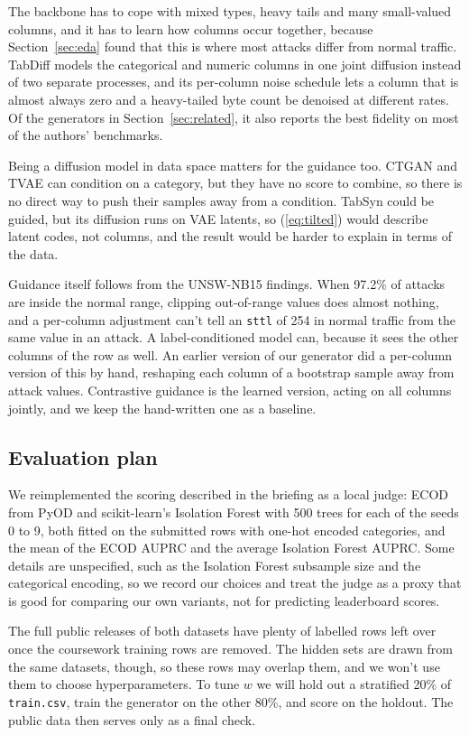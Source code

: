 \documentclass[11pt,a4paper]{article}
\newcommand{\col}[1]{\texttt{#1}}
\begin{document}
The backbone has to cope with mixed types, heavy tails and many small-valued columns, and it has to learn how columns occur together, because Section~\ref{sec:eda} found that this is where most attacks differ from normal traffic. TabDiff models the categorical and numeric columns in one joint diffusion instead of two separate processes, and its per-column noise schedule lets a column that is almost always zero and a heavy-tailed byte count be denoised at different rates. Of the generators in Section~\ref{sec:related}, it also reports the best fidelity on most of the authors' benchmarks.

Being a diffusion model in data space matters for the guidance too. CTGAN and TVAE can condition on a category, but they have no score to combine, so there is no direct way to push their samples away from a condition. TabSyn could be guided, but its diffusion runs on VAE latents, so (\ref{eq:tilted}) would describe latent codes, not columns, and the result would be harder to explain in terms of the data.

Guidance itself follows from the UNSW-NB15 findings. When 97.2\% of attacks are inside the normal range, clipping out-of-range values does almost nothing, and a per-column adjustment can't tell an \col{sttl} of 254 in normal traffic from the same value in an attack. A label-conditioned model can, because it sees the other columns of the row as well. An earlier version of our generator did a per-column version of this by hand, reshaping each column of a bootstrap sample away from attack values. Contrastive guidance is the learned version, acting on all columns jointly, and we keep the hand-written one as a baseline.

\subsection{Evaluation plan}
\label{sec:eval}

We reimplemented the scoring described in the briefing as a local judge: ECOD from PyOD and scikit-learn's Isolation Forest with 500 trees for each of the seeds 0 to 9, both fitted on the submitted rows with one-hot encoded categories, and the mean of the ECOD AUPRC and the average Isolation Forest AUPRC. Some details are unspecified, such as the Isolation Forest subsample size and the categorical encoding, so we record our choices and treat the judge as a proxy that is good for comparing our own variants, not for predicting leaderboard scores.

The full public releases of both datasets have plenty of labelled rows left over once the coursework training rows are removed. The hidden sets are drawn from the same datasets, though, so these rows may overlap them, and we won't use them to choose hyperparameters. To tune $w$ we will hold out a stratified 20\% of \col{train.csv}, train the generator on the other 80\%, and score on the holdout. The public data then serves only as a final check.
\end{document}
